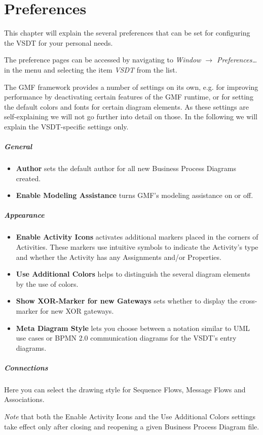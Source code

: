 \chapter{Preferences}
\label{sec:user_preferences}

This chapter will explain the several preferences that can be set for configuring
the VSDT for your personal needs.

The preference pages can be accessed by navigating to \emph{Window $\rightarrow$
Preferences\dots} in the menu and selecting the item \emph{VSDT} from the list.

The GMF framework provides a number of settings on its own, e.g. for improving
performance by deactivating certain features of the GMF runtime, or for setting
the default colors and fonts for certain diagram elements.  As these settings are
self-explaining we will not go further into detail on those.  In the following we
will explain the VSDT-specific settings only.

\paragraph{General}
\begin{itemize}
	\item \textbf{Author} sets the default author for all new Business Process
	Diagrams created.
	
	\item \textbf{Enable Modeling Assistance} turns GMF's modeling assistance on
	or off.
\end{itemize}	

\paragraph{Appearance}
\begin{itemize}
	\item \textbf{Enable Activity Icons} activates additional markers placed in
	the corners of Activities.  These markers use intuitive symbols to indicate
	the Activity's type and whether the Activity has any Assignments and/or
	Properties.
	
	\item \textbf{Use Additional Colors} helps to distinguish the several diagram
	elements by the use of colors.
	
	\item \textbf{Show XOR-Marker for new Gateways} sets whether to display the
	cross-marker for new XOR gateways.
	
	\item \textbf{Meta Diagram Style} lets you choose between a notation similar
	to UML use cases or BPMN 2.0 communication diagrams for the VSDT's entry
	diagrams.
\end{itemize}

\paragraph{Connections}
Here you can select the drawing style for Sequence Flows, Message Flows and
Associations.

\emph{Note} that both the Enable Activity Icons and the Use Additional Colors
settings take effect only after closing and reopening a given Business Process
Diagram file.

